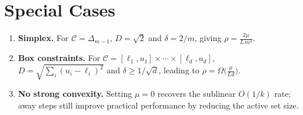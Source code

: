 \documentclass{article}
\begin{document}
\section*{Special Cases}
\begin{enumerate}
    \item \textbf{Simplex.} For $\mathcal{C}=\Delta_{m-1}$, $D=\sqrt{2}$ and $\delta=2/m$, giving $\rho = \frac{2\mu}{L\,m^2}$.
    \item \textbf{Box constraints.} For $\mathcal{C}=[\ell_1,u_1]\times\cdots\times[\ell_d,u_d]$, $D=\sqrt{\sum_{i}(u_i-\ell_i)^2}$ and $\delta\ge 1/\sqrt{d}$, leading to $\rho = \Omega\bigl(\frac{\mu}{L d}\bigr)$.
    \item \textbf{No strong convexity.} Setting $\mu=0$ recovers the sublinear $O(1/k)$ rate; away steps still improve practical performance by reducing the active set size.
\end{enumerate}
\end{document}
